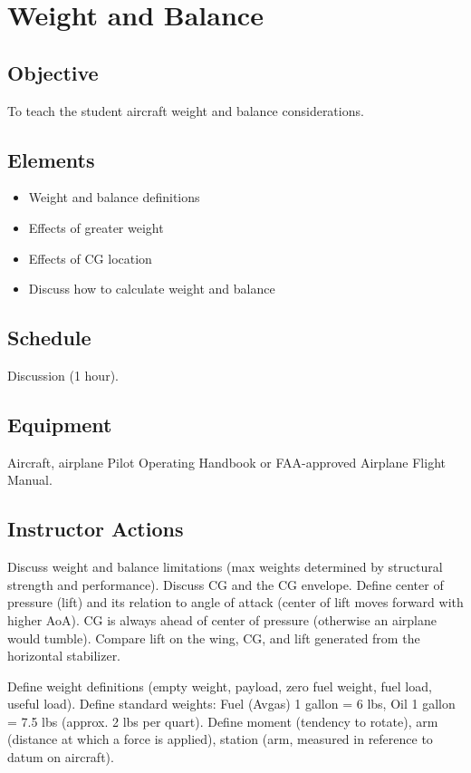 \section{Weight and Balance}

\subsection{Objective}

To teach the student aircraft weight and balance considerations.

\subsection{Elements}

\begin{itemize}
  \item Weight and balance definitions
  \item Effects of greater weight
  \item Effects of CG location
  \item Discuss how to calculate weight and balance
\end{itemize}

\subsection{Schedule}

Discussion (1 hour).

\subsection{Equipment}

Aircraft, airplane Pilot Operating Handbook or FAA-approved Airplane Flight
Manual.

\subsection{Instructor Actions}

Discuss weight and balance limitations (max weights determined by structural
strength and performance). Discuss CG and the CG envelope. Define center of
pressure (lift) and its relation to angle of attack (center of lift moves
forward with higher AoA). CG is always ahead of center of pressure (otherwise
an airplane would tumble). Compare lift on the wing, CG, and lift generated
from the horizontal stabilizer.

Define weight definitions (empty weight, payload, zero fuel weight, fuel load,
useful load). Define standard weights: Fuel (Avgas) 1 gallon = 6 lbs, Oil 1
gallon = 7.5 lbs (approx. 2 lbs per quart). Define moment (tendency to rotate),
arm (distance at which a force is applied), station (arm, measured in reference
to datum on aircraft).

